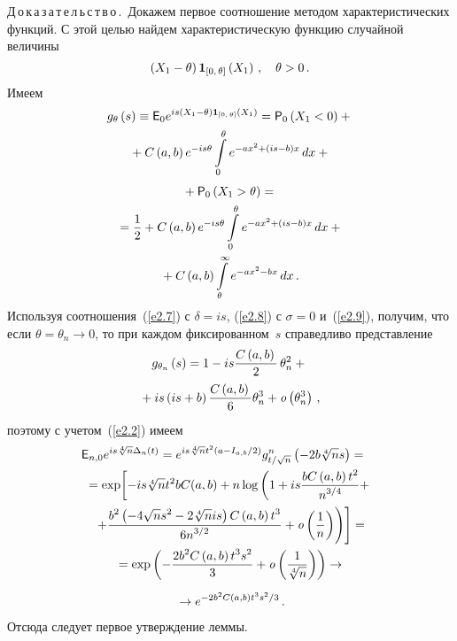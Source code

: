 \begin{multicols}{2}
\noindent
Д\,о\,к\,а\,з\,а\,т\,е\,л\,ь\,с\,т\,в\,о\,.\ Докажем первое соотношение методом
характеристических функций. С этой целью найдем характеристическую
функцию случайной величины
$$
\left(X_{1} - \theta \right){{\bf 1}}_{\left[0,\,\theta\right]}\left(X_{1}\right)\,,\quad \theta >0\,.
$$
Имеем
\begin{multline*}
g_{\theta}\left(s\right) \equiv {\e}_{0} 
e^{is\left(X_{1} - \theta \right){\IT}_{\left[0,\,\theta\right]} \left(X_{1}\right)} =
{\p}_{0} \left(X_{1} <0\right)+{}\\
{}+
 C\left(a,b\right) e^{-is\theta} \int\limits_{0}^{\theta }
e^{-ax^{2}+\left(is-b\right)x}\,dx +{} %
\end{multline*}
\begin{multline*}
{}+ {{\sf P}}_{0}\left(X_{1} > \theta\right) ={}\\
{}
=\displaystyle\frac{\displaystyle 1\mathstrut}{\displaystyle 2\mathstrut}+ C\left(a,b\right) e^{-is\theta}
\int\limits_{0}^{\theta} e^{-ax^{2}+\left(is-b\right)x}\,dx
+{}\\
{}+ 
C\left(a,b\right)\int\limits_{\theta}^{\infty} e^{-ax^{2}-bx}\,dx\,.
\end{multline*}
Используя соотношения~(\ref{e2.7}) с $\delta= is$, (\ref{e2.8}) с
$\sigma= 0$ и~(\ref{e2.9}), получим, что
если $\theta = \theta_{n} \to 0$, то при каж\-дом фиксированном~$s$
справедливо представление
\begin{multline}
g_{\theta_n}\left(s\right) = 1 - is \displaystyle\frac{\displaystyle C\left(a,b\right)\mathstrut}{\displaystyle 2\mathstrut}\,
\theta_{n}^{2} +{}\\
{}+
 is\left(is + b\right)
\displaystyle\frac{\displaystyle C\left(a,b\right)\mathstrut}{\displaystyle 6\mathstrut}\theta_{n}^{3}+{\it o}
\left(\theta_{n}^{3}\right)\,, \label{e3.6}
\end{multline}
поэтому с учетом~(\ref{e2.2}) имеем
\begin{multline}
\!\!\!\!\!\!{\e}_{n,0} e^{is\sqrt[{4}]{n}\Delta_{n}\left(t\right)}
= e^{is\sqrt[{4}]{n}t^{2}\left(a - I_{a,b}/2\right)}g_{t/\sqrt{n}}^{n}\left(-2b\sqrt[{4}]{n}
s\right)={}\\
\!{}
=\exp\!\left[ -is\sqrt[{4}]{n} t^{2}bC\!\left(a,b\right)
+ n\log\left(1 + is\fr{bC\left(a,b\right)t^{2}}
{n^{3/4}}+\right.\right.{}\hspace*{-0.785pt}\\
{}\left.\left.+ \fr{b^{2}\left(-4\sqrt{n} s^{2}-2\sqrt[{4}]{n}is\right)C\left(a,b\right)t^{3}}
{6n^{3/2}}+{\it o}\left(\fr{1}{n}\right)\right)\right]={}\\
{}
=\exp\left(-\fr{2b^{2}C\left(a,b\right)t^{3}
s^{2} }{3}+{\it o}\left(\fr{1}{\sqrt[{4}]{n}}\right)\right)\to{}\\[6pt]
{}\to
e^{-2b^{2}C\left(a,b\right)t^{3} s^{2} /3}\,. \label{e3.7}
\end{multline}
Отсюда следует  первое утверждение леммы.


\end{multicols}

